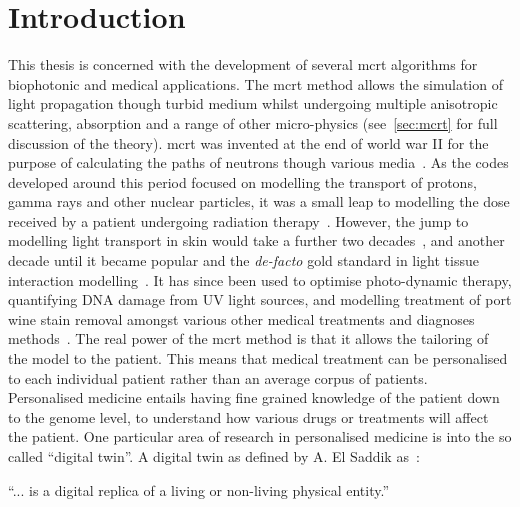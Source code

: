 \chapter{Introduction}


%
%
%
This thesis is concerned with the development of several \gls*{mcrt} algorithms for biophotonic and medical applications.
The \gls*{mcrt} method allows the simulation of light propagation though turbid medium whilst undergoing multiple anisotropic scattering, absorption and a range of other micro-physics (see~\cref{sec:mcrt} for full discussion of the theory).
\Gls*{mcrt} was invented at the end of world war II for the purpose of calculating the paths of neutrons though various media~\cite{montybeg1,eckhardt1987stan,anderson1986metropolis,ulam1947statistical}.
As the codes developed around this period focused on modelling the transport of protons, gamma rays and other nuclear particles, it was a small leap to modelling the dose received by a patient undergoing radiation therapy~\cite{ellett1964gamma}.
However, the jump to modelling light transport in skin would take a further two decades~\cite{wilson1983monte}, and another decade until it became popular and the \textit{de-facto} gold standard in light tissue interaction modelling~\cite{wang1995mcml,key1991monte}.
It has since been used to optimise photo-dynamic therapy, quantifying DNA damage from UV light sources, and modelling treatment of port wine stain removal amongst various other medical treatments and diagnoses methods~\cite{barnard2018quantifying,smithies1995modelling,campbell2015monte}.
The real power of the \gls*{mcrt} method is that it allows the tailoring of the model to the patient.
This means that medical treatment can be personalised to each individual patient rather than an average corpus of patients.\\


Personalised medicine entails having fine grained knowledge of the patient down to the genome level, to understand how various drugs or treatments will affect the patient.
One particular area of research in personalised medicine is into the so called ``digital twin''.
A digital twin as defined by A. El Saddik as~\cite{el2018digital}:

\medskip
``... is a digital replica of a living or non-living physical entity.''
\medskip


